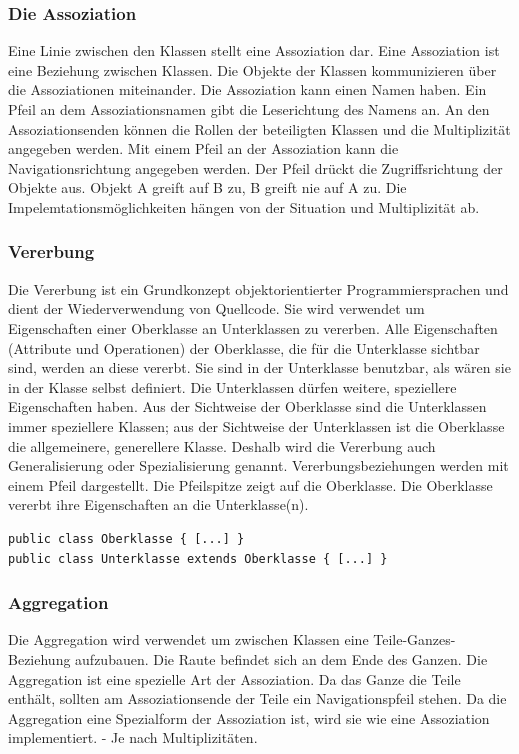 \documentclass[a4paper,10pt,DIV9, BCOR12mm, oneside,openright,openbib]{scrreprt}
\theoremstyle{definition}
\theoremstyle{plain}
\begin{document}
\subsubsection{Die Assoziation}
Eine Linie zwischen den Klassen stellt eine Assoziation dar. Eine Assoziation ist eine Beziehung zwischen Klassen. Die Objekte der Klassen kommunizieren über die Assoziationen miteinander. Die Assoziation kann einen Namen haben. Ein Pfeil an dem  Assoziationsnamen  gibt die Leserichtung  des Namens an. An den Assoziationsenden können die Rollen der beteiligten Klassen und die Multiplizität angegeben werden. 
Mit einem Pfeil an der Assoziation kann die Navigationsrichtung angegeben werden. Der Pfeil drückt die Zugriffsrichtung der Objekte aus. Objekt A greift auf B zu, B greift nie auf A zu. Die Impelemtationsmöglichkeiten hängen von der Situation und Multiplizität ab. 


\subsubsection{Vererbung}
Die Vererbung ist ein Grundkonzept objektorientierter Programmiersprachen und dient der Wiederverwendung von Quellcode. Sie wird verwendet um Eigenschaften einer Oberklasse an Unterklassen zu vererben. Alle Eigenschaften (Attribute und Operationen) der Oberklasse, die für die Unterklasse sichtbar sind, werden an diese vererbt. Sie sind in der Unterklasse benutzbar, als wären sie in der Klasse selbst definiert. Die Unterklassen dürfen weitere, speziellere Eigenschaften haben. Aus der Sichtweise der Oberklasse sind die Unterklassen immer speziellere Klassen; aus der Sichtweise der Unterklassen ist die Oberklasse die allgemeinere, generellere Klasse. Deshalb wird die Vererbung auch Generalisierung oder Spezialisierung genannt. Vererbungsbeziehungen werden mit einem Pfeil dargestellt. Die  Pfeilspitze zeigt auf die Oberklasse. Die Oberklasse vererbt ihre Eigenschaften an die Unterklasse(n).
\begin{lstlisting}[caption=Implementierung Vererbung]
public class Oberklasse { [...] }
public class Unterklasse extends Oberklasse { [...] }
\end{lstlisting}

\subsubsection{Aggregation}
Die Aggregation wird verwendet um zwischen Klassen eine Teile-Ganzes-Beziehung aufzubauen. Die Raute befindet sich an dem Ende des Ganzen. Die Aggregation ist eine spezielle Art der Assoziation. Da das Ganze die Teile enthält, sollten am  Assoziationsende der Teile ein Navigationspfeil stehen. Da die Aggregation eine Spezialform der Assoziation ist, wird sie wie eine Assoziation implementiert. - Je nach Multiplizitäten.
\end{document}
